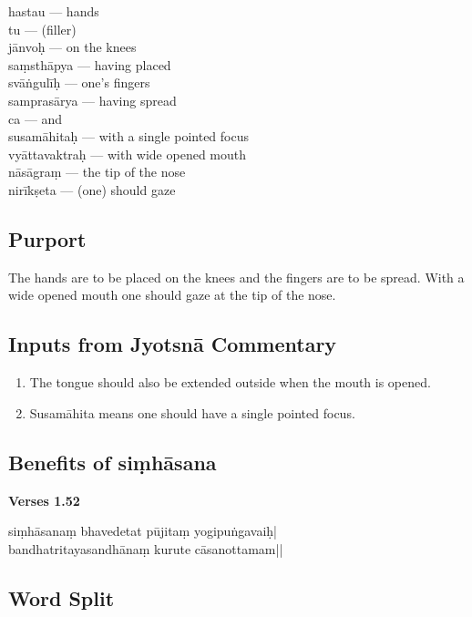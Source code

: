 \begin{multicols}{2}
hastau ---  hands \\
tu ---  (filler) \\
jānvoḥ ---  on the knees  \\
saṃsthāpya ---  having placed  \\
svāṅgulīḥ ---  one’s fingers  \\
samprasārya ---  having spread \\
ca ---  and \\
susamāhitaḥ --- with a single pointed focus  \\
vyāttavaktraḥ ---  with wide opened mouth  \\
nāsāgraṃ ---  the tip of the nose  \\
nirīkṣeta ---  (one) should gaze
\end{multicols}

\subsection*{Purport}

The hands are to be placed on the knees and the fingers are to be spread. With a wide opened mouth one should gaze at the tip of the nose. 

\subsection*{Inputs from Jyotsnā Commentary}

\begin{enumerate}
\item The tongue should also be extended outside when the mouth is opened.
\item Susamāhita means one should have a single pointed focus.
\end{enumerate}
\newpage

\subsection*{Benefits of siṃhāsana}

\noindent \textbf{Verses 1.52}

\begin{shloka}
siṃhāsanaṃ bhavedetat pūjitaṃ yogipuṅgavaiḥ|\\
bandhatritayasandhānaṃ kurute cāsanottamam||
\end{shloka}

\subsection*{Word Split}

